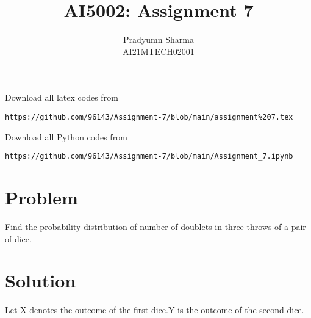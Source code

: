 \documentclass[journal,12pt,twocolumn]{IEEEtran}
\begin{document}
\def\putbox#1#2#3{\makebox[0in][l]{\makebox[#1][l]{}\raisebox{\baselineskip}[0in][0in]{\raisebox{#2}[0in][0in]{#3}}}}
     \def\rightbox#1{\makebox[0in][r]{#1}}
     \def\centbox#1{\makebox[0in]{#1}}
     \def\topbox#1{\raisebox{-\baselineskip}[0in][0in]{#1}}
     \def\midbox#1{\raisebox{-0.5\baselineskip}[0in][0in]{#1}}
\vspace{3cm}
\title{AI5002: Assignment 7}
\author{Pradyumn Sharma\\ AI21MTECH02001}
\maketitle
\newpage
\bigskip
\renewcommand{\thefigure}{\theenumi}
\renewcommand{\thetable}{\theenumi}
Download all latex codes from 
%
\begin{lstlisting}
https://github.com/96143/Assignment-7/blob/main/assignment%207.tex
\end{lstlisting}
%
Download all Python codes from 
%
\begin{lstlisting}
https://github.com/96143/Assignment-7/blob/main/Assignment_7.ipynb
\end{lstlisting}
%
\section{Problem}
Find the probability distribution of number of doublets in three throws of a pair of dice.
\section{Solution}
Let X denotes the outcome of the first dice.Y is the outcome of the second dice.\\
\end{document}
